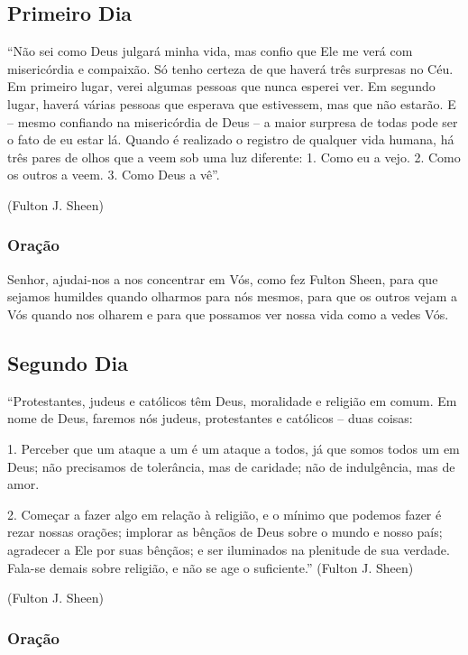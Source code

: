 \documentclass[11pt]{article}
\begin{document}
\subsection{Primeiro Dia}

“Não sei como Deus julgará minha vida, mas confio que Ele me verá com misericórdia e compaixão. Só tenho certeza de que haverá três surpresas no Céu. Em primeiro lugar, verei algumas pessoas que nunca esperei ver. Em segundo lugar, haverá várias pessoas que esperava que estivessem, mas que não estarão. E – mesmo confiando na misericórdia de Deus – a maior surpresa de todas pode ser o fato de eu estar lá. Quando é realizado o registro de qualquer vida humana, há três pares de olhos que a veem sob uma luz diferente: 1. Como eu a vejo. 2. Como os outros a veem. 3. Como Deus a vê”.

(Fulton J. Sheen)


\subsubsection{Oração}

Senhor, ajudai-nos a nos concentrar em Vós, como fez Fulton Sheen, para que sejamos humildes quando olharmos para nós mesmos, para que os outros vejam a Vós quando nos olharem e para que possamos ver nossa vida como a vedes Vós.

\textbf{}


\subsection{Segundo Dia}

“Protestantes, judeus e católicos têm Deus, moralidade e religião em comum. Em nome de Deus, faremos nós judeus, protestantes e católicos – duas coisas: 

1. Perceber que um ataque a um é um ataque a todos, já que somos todos um em Deus; não precisamos de tolerância, mas de caridade; não de indulgência, mas de amor. 

2. Começar a fazer algo em relação à religião, e o mínimo que podemos fazer é rezar nossas orações; implorar as bênçãos de Deus sobre o mundo e nosso país; agradecer a Ele por suas bênçãos; e ser iluminados na plenitude de sua verdade. Fala-se demais sobre religião, e não se age o suficiente.” (Fulton J. Sheen)

(Fulton J. Sheen)


\subsubsection{Oração}
\end{document}
